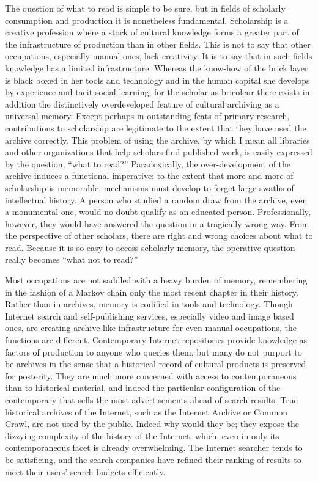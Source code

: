 \documentclass[]{book}
\theoremstyle{definition}
\theoremstyle{definition}
\theoremstyle{definition}
\theoremstyle{remark}
\begin{document}
The question of what to read is simple to be sure, but in fields of
scholarly consumption and production it is nonetheless fundamental.
Scholarship is a creative profession where a stock of cultural knowledge
forms a greater part of the infrastructure of production than in other
fields. This is not to say that other occupations, especially manual
ones, lack creativity. It is to say that in such fields knowledge has a
limited infrastructure. Whereas the know-how of the brick layer is black
boxed in her tools and technology and in the human capital she develops
by experience and tacit social learning, for the scholar as bricoleur
there exists in addition the distinctively overdeveloped feature of
cultural archiving as a universal memory. Except perhaps in outstanding
feats of primary research, contributions to scholarship are legitimate
to the extent that they have used the archive correctly. This problem of
using the archive, by which I mean all libraries and other organizations
that help scholars find published work, is easily expressed by the
question, ``what to read?'' Paradoxically, the over-development of the
archive induces a functional imperative: to the extent that more and
more of scholarship is memorable, mechanisms must develop to forget
large swaths of intellectual history. A person who studied a random draw
from the archive, even a monumental one, would no doubt qualify as an
educated person. Professionally, however, they would have answered the
question in a tragically wrong way. From the perspective of other
scholars, there are right and wrong choices about what to read. Because
it is so easy to access scholarly memory, the operative question really
becomes ``what not to read?''

Most occupations are not saddled with a heavy burden of memory,
remembering in the fashion of a Markov chain only the most recent
chapter in their history. Rather than in archives, memory is codified in
tools and technology. Though Internet search and self-publishing
services, especially video and image based ones, are creating
archive-like infrastructure for even manual occupations, the functions
are different. Contemporary Internet repositories provide knowledge as
factors of production to anyone who queries them, but many do not
purport to be archives in the sense that a historical record of cultural
products is preserved for posterity. They are much more concerned with
access to contemporaneous than to historical material, and indeed the
particular configuration of the contemporary that sells the most
advertisements ahead of search results. True historical archives of the
Internet, such as the Internet Archive or Common Crawl, are not used by
the public. Indeed why would they be; they expose the dizzying
complexity of the history of the Internet, which, even in only its
contemporaneous facet is already overwhelming. The Internet searcher
tends to be satisficing, and the search companies have refined their
ranking of results to meet their users' search budgets efficiently.
\end{document}
